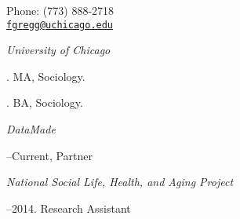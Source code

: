 \documentclass[11pt]{article}
\makeatletter
\def\myemail{fgregg@uchicago.edu}
\def\myphone{(773) 888-2718}
\makeatother
\begin{document}
\begin{minipage}[t]{2.95in}
  
\end{minipage}
\hfill     
\hfill
\begin{minipage}[t]{1.7in}
  \flushright \footnotesize Phone: \myphone \\ 
  {\scriptsize  \texttt{\href{mailto:\myemail}{\myemail}}} \\
\end{minipage}


\medskip

\reversemarginpar

\medskip       



\noindent\emph{University of Chicago \vspace{0.01in}}

. MA, Sociology.

\medskip

. BA, Sociology. 

\medskip
{}

\noindent\emph{DataMade \vspace{0.01in}}

--Current, Partner

\medskip

\noindent\emph{National Social Life, Health, and Aging Project \vspace{0.01in}}

--2014. Research Assistant

\medskip
\end{document}
